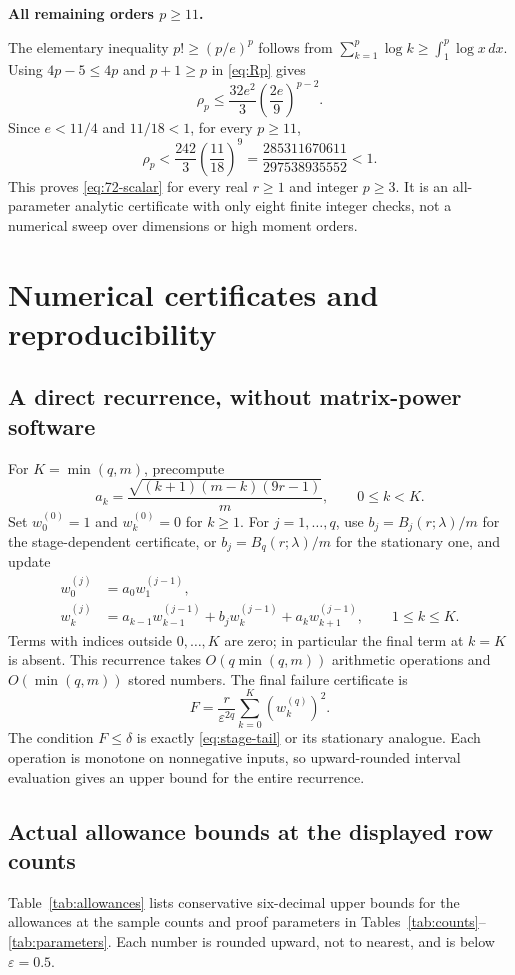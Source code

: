 \documentclass[11pt]{article}
\numberwithin{equation}{section}
\theoremstyle{definition}\newtheorem{definition}[theorem]{Definition}
\theoremstyle{remark}\newtheorem{remark}[theorem]{Remark}
\newcommand{\step}[1]{\par\addvspace{.65\baselineskip}\Needspace{4\baselineskip}\noindent\textbf{#1}\par\nobreak\smallskip}
\begin{document}
\step{All remaining orders $p\ge11$.}
The elementary inequality $p!\ge(p/e)^p$ follows from
$\sum_{k=1}^p\log k\ge\int_1^p\log x\,dx$.
Using $4p-5\le4p$ and $p+1\ge p$ in \eqref{eq:Rp} gives
\[
 \rho_p\le\frac{32e^2}{3}\left(\frac{2e}{9}\right)^{p-2}.
\]
Since $e<11/4$ and $11/18<1$, for every $p\ge11$,
\[
 \rho_p<\frac{242}{3}\left(\frac{11}{18}\right)^9
 =\frac{285311670611}{297538935552}<1.
\]
This proves \eqref{eq:72-scalar} for every real $r\ge1$ and integer $p\ge3$.
It is an all-parameter analytic certificate with only eight finite integer checks,
not a numerical sweep over dimensions or high moment orders.

\section{Numerical certificates and reproducibility}\label{app:checks}
\subsection{A direct recurrence, without matrix-power software}
For $K=\min(q,m)$, precompute
\[
 a_k=\frac{\sqrt{(k+1)(m-k)(9r-1)}}m,\qquad 0\le k<K.
\]
Set $w_0^{(0)}=1$ and $w_k^{(0)}=0$ for $k\ge1$.
For $j=1,\ldots,q$, use $b_j=B_j(r;\lambda)/m$ for the stage-dependent
certificate, or $b_j=B_q(r;\lambda)/m$ for the stationary one, and update
\begin{equation}\label{eq:recurrence}
 \begin{aligned}
 w_0^{(j)}&=a_0w_1^{(j-1)},\\
 w_k^{(j)}&=a_{k-1}w_{k-1}^{(j-1)}+b_jw_k^{(j-1)}
             +a_kw_{k+1}^{(j-1)},\qquad 1\le k\le K.
 \end{aligned}
\end{equation}
Terms with indices outside $0,\ldots,K$ are zero; in particular the final term
at $k=K$ is absent. This recurrence takes $O(q\min(q,m))$ arithmetic operations
and $O(\min(q,m))$ stored numbers. The final failure certificate is
\[
 F=\frac r{\varepsilon^{2q}}\sum_{k=0}^K(w_k^{(q)})^2.
\]
The condition $F\le\delta$ is exactly \eqref{eq:stage-tail} or its stationary
analogue. Each operation is monotone on nonnegative inputs, so upward-rounded
interval evaluation gives an upper bound for the entire recurrence.

\subsection{Actual allowance bounds at the displayed row counts}
Table~\ref{tab:allowances} lists conservative six-decimal upper bounds for the
allowances at the sample counts and proof parameters in
Tables~\ref{tab:counts}--\ref{tab:parameters}. Each number is rounded upward,
not to nearest, and is below $\varepsilon=0.5$.
\end{document}
